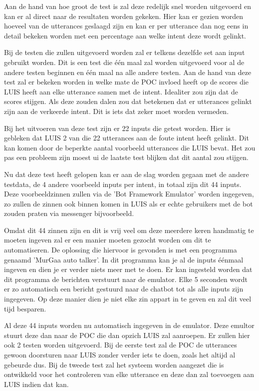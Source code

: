 Aan de hand van hoe groot de test is zal deze redelijk snel worden uitgevoerd en kan er al direct naar de resultaten worden gekeken. Hier kan er gezien worden hoeveel van de utterances geslaagd zijn en kan er per utterance dan nog eens in detail bekeken worden met een percentage aan welke intent deze wordt gelinkt.

Bij de testen die zullen uitgevoerd worden zal er telkens dezelfde set aan input gebruikt worden. Dit is een test die één maal zal worden uitgevoerd voor al de andere testen beginnen en één maal na alle andere testen. Aan de hand van deze test zal er bekeken worden in welke mate de POC invloed heeft op de scores die LUIS heeft aan elke utterance samen met de intent. Idealiter zou zijn dat de scores stijgen. Als deze zouden dalen zou dat betekenen dat er utterances gelinkt zijn aan de verkeerde intent. Dit is iets dat zeker moet worden vermeden.

Bij het uitvoeren van deze test zijn er 22 inputs die getest worden. Hier is gebleken dat LUIS 2 van die 22 utterances aan de foute intent heeft gelinkt. Dit kan komen door de beperkte aantal voorbeeld utterances die LUIS bevat. Het zou pas een probleem zijn moest ui de laatste test blijken dat dit aantal zou stijgen.

Nu dat deze test heeft gelopen kan er aan de slag worden gegaan met de andere testdata, de 4 andere voorbeeld inputs per intent, in totaal zijn dit 44 inputs. Deze voorbeeldzinnen zullen via de 'Bot Framework Emulator' worden ingegeven, zo zullen de zinnen ook binnen komen in LUIS als er echte gebruikers met de bot zouden praten via messenger bijvoorbeeld.

Omdat dit 44 zinnen zijn en dit is vrij veel om deze meerdere keren handmatig te moeten ingeven zal er een manier moeten gezocht worden om dit te automatiseren. De oplossing die hiervoor is gevonden is met een programma genaamd 'MurGaa auto talker'. In dit programma kan je al de inputs éénmaal ingeven en dien je er verder niets meer met te doen. Er kan ingesteld worden dat dit programma de berichten verstuurt naar de emulator. Elke 5 seconden wordt er zo automatisch een bericht gestuurd naar de chatbot tot als alle inputs zijn ingegeven. Op deze manier dien je niet elke zin appart in te geven en zal dit veel tijd besparen.

Al deze 44 inputs worden nu automatisch ingegeven in de emulator. Deze emultor stuurt deze dan naar de POC die dan opzich LUIS zal aanroepen. Er zullen hier ook 2 testen worden uitgevoerd. Bij de eerste test zal de POC de utterances gewoon doorsturen naar LUIS zonder verder iets te doen, zoals het altijd al gebeurde dus. Bij de tweede test zal het systeem worden aangezet die is ontwikkeld voor het controleren van elke utterance en deze dan zal toevoegen aan LUIS indien dat kan.

